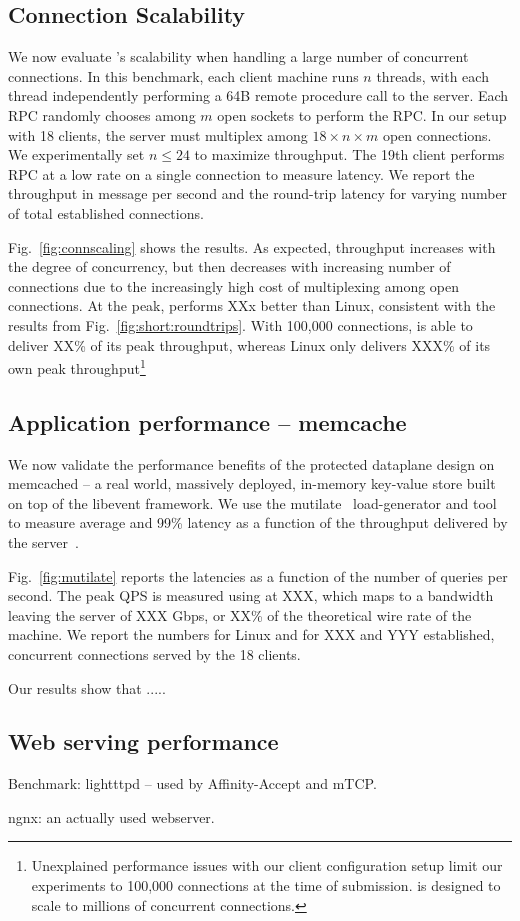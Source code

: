 \subsection{Connection Scalability}


\label{sec:eval:scale}

We now evaluate \ix's scalability when handling a large number of
concurrent connections. In this benchmark, each client machine runs
$n$ threads, with each thread independently performing a 64B remote
procedure call to the server.  Each RPC randomly chooses among $m$
open sockets to perform the RPC.  In our setup with 18 clients, the
server must multiplex among $18 \times n \times m$ open connections.
We experimentally set $n \leq 24$ to maximize throughput.  The 19th
client performs RPC at a low rate on a single connection to measure
latency.  We report the throughput in message per second and the
round-trip latency for varying number of total established connections.

Fig.~\ref{fig:connscaling} shows the results.  As expected, throughput
increases with the degree of concurrency, but then decreases with
increasing number of connections due to the increasingly high cost of
multiplexing among open connections.  At the peak, \ix performs XXx
better than Linux, consistent with the results from
Fig.~\ref{fig:short:roundtrips}.  With 100,000 connections, \ix is
able to deliver XX\% of its peak throughput, whereas Linux only
delivers XXX\% of its own peak throughput\footnote{Unexplained
  performance issues with our client configuration setup limit our
  experiments to 100,000 connections at the time of submission. \ix is
  designed to scale to millions of concurrent connections.}


\subsection{Application performance -- memcache}
\label{sec:eval:memcache}



We now validate the performance benefits of the protected dataplane
design on memcached -- a real world, massively deployed, in-memory
key-value store built on top of the libevent framework.  We use the
mutilate~\cite{url:mutilate} load-generator and tool to measure
average and 99\% latency as a function of the throughput delivered by
the server~\cite{Leverich:RHSU:2014}.

Fig.~\ref{fig:mutilate} reports the latencies as a function of the
number of queries per second.  The peak QPS is measured using \ix at
XXX, which maps to a bandwidth leaving the server of XXX Gbps, or XX\%
of the theoretical wire rate of the machine.  We report the numbers
for Linux and \ix for XXX and YYY established, concurrent
connections served by the 18 clients.

Our results show that .....

\subsection{Web serving performance}


\todo Benchmark: lightttpd -- used by Affinity-Accept and mTCP.  

\todo ngnx: an actually used webserver.



%
